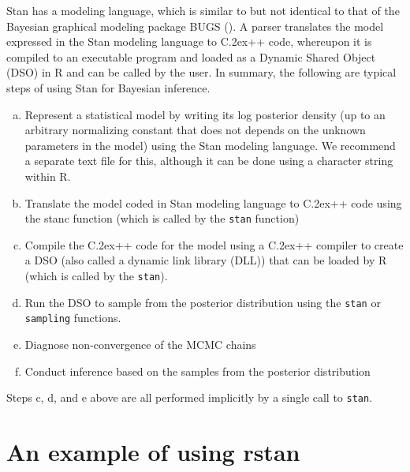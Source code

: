 \documentclass[12pt]{article}
\newcommand{\R}{R\xspace}
\newcommand{\Stan}{Stan\xspace}
\newcommand{\stanc}{{\ttfamily stanc}\xspace}
\newcommand*{\Cpp}{C\raise.2ex\hbox{\footnotesize ++}\xspace} %
\newcommand{\code}[1]{{\tt #1}}
\newcommand{\strong}[1]{\texorpdfstring%
          {{\normalfont\fontseries{b}\selectfont #1}}%
            {#1}}
\let\pkg=\strong
\begin{document}
              \Stan has a modeling language, which is similar to 
              but not identical to that of the Bayesian graphical modeling package 
              BUGS (\citealt{WinBUGS}). A parser translates the model expressed in the \Stan modeling 
              language to \Cpp code, whereupon it is compiled to an executable program and loaded as
              a Dynamic Shared Object (DSO) in \R and can be called by the user.
              In summary, the following are typical steps of using \Stan for Bayesian inference. 
              \begin{enumerate}[a.]\addtolength{\itemsep}{-0.6\baselineskip}
              \item Represent a statistical model by writing its log posterior
              density (up to an arbitrary normalizing constant that does not 
              depends on the unknown parameters in the model) using the \Stan modeling language.
              We recommend a separate text file for this, although it can be done using a
              character string within \R.
              \item Translate the model coded in \Stan modeling language to \Cpp code using the \stanc
              function (which is called by the \code{stan} function)
              \item Compile the \Cpp code for the model using a \Cpp compiler to
              create a DSO (also called a dynamic link library (DLL)) that can be loaded by \R
              (which is called by the \code{stan}).
              \item Run the DSO to sample from the posterior distribution using the 
              \code{stan} or \code{sampling} functions.
              \item Diagnose non-convergence of the MCMC chains
              \item Conduct inference based on the samples from the posterior distribution
              \end{enumerate}
              
              Steps c, d, and e above are all performed implicitly by a single call to \code{stan}.
              
              \section[An example of using rstan]{An example of using \pkg{rstan}}
              \label{sec0example} 
              
\end{document}
